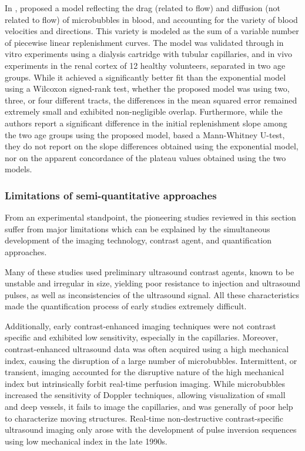 In \citeyear{Quaia:2009fs}, \citet{Quaia:2009fs} proposed a model reflecting the drag (related to flow) and diffusion (not related to flow) of microbubbles in blood, and accounting for the variety of blood velocities and directions. %
This variety is modeled as the sum of a variable number of piecewise linear replenishment curves.
The model was validated through in vitro experiments using a dialysis cartridge with tubular capillaries, and in vivo experiments in the renal cortex of 12 healthy volunteers, separated in two age groups. 
While it achieved a significantly better fit than the exponential model using a Wilcoxon signed-rank test, whether the proposed model was using two, three, or four different tracts, the differences in the mean squared error remained extremely small and exhibited non-negligible overlap.
Furthermore, while the authors report a significant difference in the initial replenishment slope among the two age groups using the proposed model, based a Mann-Whitney U-test, they do not report on the slope differences obtained using the exponential model, nor on the apparent concordance of the plateau values obtained using the two models.

\subsubsection{Limitations of semi-quantitative approaches}
From an experimental standpoint, the pioneering studies reviewed in this section suffer from major limitations which can be explained by the simultaneous development of the imaging technology, contrast agent, and quantification approaches.

Many of these studies used preliminary ultrasound contrast agents, known to be unstable and irregular in size, yielding poor resistance to injection and ultrasound pulses, as well as inconsistencies of the ultrasound signal.
All these characteristics made the quantification process of early studies extremely difficult.

Additionally, early contrast-enhanced imaging techniques were not contrast specific and exhibited low sensitivity, especially in the capillaries.
Moreover, contrast-enhanced ultrasound data was often acquired using a high mechanical index, causing the disruption of a large number of microbubbles.
Intermittent, or transient, imaging accounted for the disruptive nature of the high mechanical index but intrinsically forbit real-time perfusion imaging.
While microbubbles increased the sensitivity of Doppler techniques, allowing visualization of small and deep vessels, it fails to image the capillaries, and was generally of poor help to characterize moving structures.
Real-time non-destructive contrast-specific ultrasound imaging only arose with the development of pulse inversion sequences using low mechanical index in the late 1990s.

